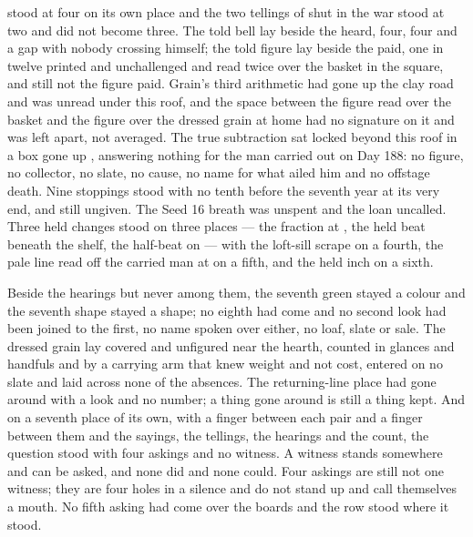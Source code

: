  stood at four on its own place and the two tellings of  shut in the war stood at two and did not become three. The told bell lay beside the heard, four, four and a gap with nobody crossing himself; the told figure lay beside the paid, one in twelve printed and unchallenged and read twice over the basket in the square, and still not the figure paid. Grain's third arithmetic had gone up the clay road and was unread under this roof, and the space between the figure read over the basket and the figure over the dressed grain at home had no signature on it and was left apart, not averaged. The true subtraction sat locked beyond this roof in a box gone up , answering nothing for the man carried out on Day 188: no figure, no collector, no slate, no cause, no name for what ailed him and no offstage death. Nine stoppings stood with no tenth before the seventh year at its very end, and still ungiven. The Seed 16 breath was unspent and the loan uncalled. Three held changes stood on three places --- the fraction at , the held beat beneath the shelf, the half-beat on  --- with the loft-sill scrape on a fourth, the pale line read off the carried man at  on a fifth, and the held inch on a sixth.

Beside the hearings but never among them, the seventh green stayed a colour and the seventh shape stayed a shape; no eighth had come and no second look had been joined to the first, no name spoken over either, no loaf, slate or sale. The dressed grain lay covered and unfigured near the hearth, counted in glances and handfuls and by a carrying arm that knew weight and not cost, entered on no slate and laid across none of the absences. The returning-line place had gone around with a look and no number; a thing gone around is still a thing kept. And on a seventh place of its own, with a finger between each pair and a finger between them and the sayings, the tellings, the hearings and the count, the question stood with four askings and no witness. A witness stands somewhere and can be asked, and none did and none could. Four askings are still not one witness; they are four holes in a silence and do not stand up and call themselves a mouth. No fifth asking had come over the boards and the row stood where it stood.

